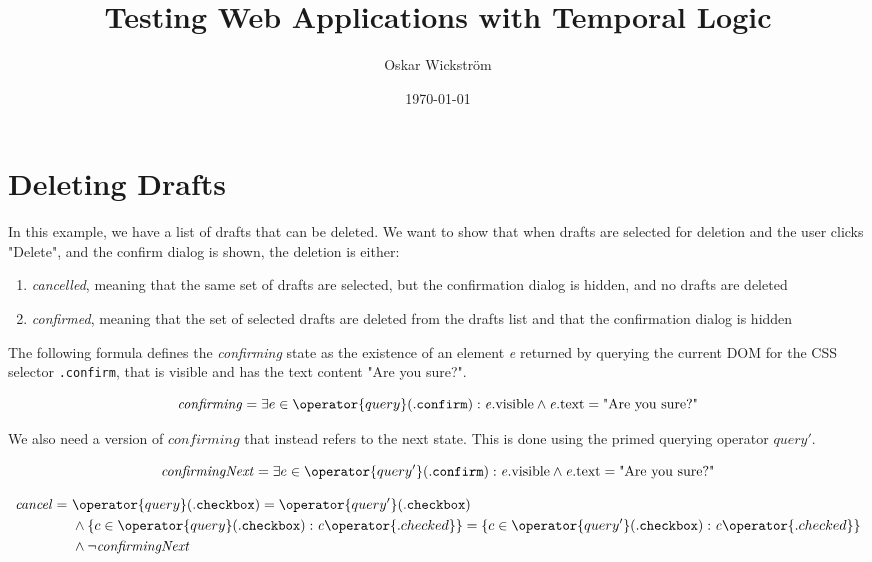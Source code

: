 \documentclass[11pt]{article}
\author{Oskar Wickström}
\date{\today}
\title{Testing Web Applications with Temporal Logic}
\begin{document}
\maketitle
\tableofcontents


\section{Deleting Drafts}
\label{sec:org3bde0be}

In this example, we have a list of drafts that can be deleted. We want
to show that when drafts are selected for deletion and the user clicks
"Delete", and the confirm dialog is shown, the deletion is either:

\begin{enumerate}
\item \emph{cancelled}, meaning that the same set of drafts are selected, but
the confirmation dialog is hidden, and no drafts are deleted
\item \emph{confirmed}, meaning that the set of selected drafts are deleted
from the drafts list and that the confirmation dialog is hidden
\end{enumerate}

The following formula defines the \emph{confirming} state as the existence
of an element \emph{e} returned by querying the current DOM for the CSS
selector \texttt{.confirm}, that is visible and has the text content "Are you
sure?".

\begin{equation}
\label{eq:org3444a13}
\mathit{confirming} = \exists e \in \operator{query}(\mathtt{.confirm}) : \mathit{e}.\mathrm{visible} \wedge \mathit{e}.\mathrm{text} = \text{"Are you sure?"} \\
\end{equation}

We also need a version of \(\mathit{confirming}\) that instead refers to the next
state. This is done using the primed querying operator \(\mathit{query'}\).

\begin{equation}
\label{eq:org7e7070d}
\mathit{confirmingNext} = \exists e \in \operator{query'}(\mathtt{.confirm}) : \mathit{e}.\mathrm{visible} \wedge \mathit{e}.\mathrm{text} = \text{"Are you sure?"} \\
\end{equation}

\begin{equation}
\label{eq:org2f66926}
\begin{aligned}
\mathit{cancel} =\ & \operator{query}(\mathtt{.checkbox}) = \operator{query'}(\mathtt{.checkbox}) \\
  & \wedge \{c \in \operator{query}(\mathtt{.checkbox}) : \mathit{c}\operator{.checked} \} = \{c \in \operator{query'}(\mathtt{.checkbox}) : \mathit{c}\operator{.checked} \} \\
  & \wedge \lnot \mathit{confirmingNext} \\
\end{aligned}
\end{equation}
\end{document}
